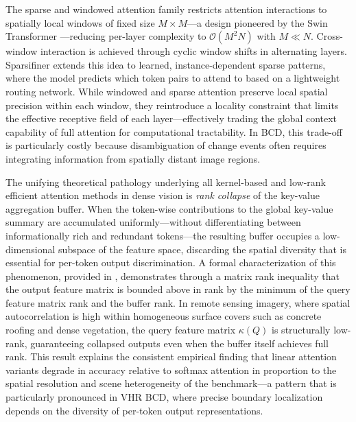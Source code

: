 The sparse and windowed attention family restricts attention interactions to
spatially local windows of fixed size $M \times M$---a design pioneered by
the Swin Transformer \cite{Liu2021Swin}---reducing per-layer complexity
to $\mathcal{O}(M^2 N)$ with $M \ll N$. Cross-window
interaction is achieved through cyclic window shifts in alternating layers.
Sparsifiner \cite{Wei2023Sparsifiner} extends this idea to learned,
instance-dependent sparse patterns, where the model predicts which token
pairs to attend to based on a lightweight routing network. While windowed and
sparse attention preserve local spatial precision within each window, they
reintroduce a locality constraint that limits the effective receptive field
of each layer---effectively trading the global context capability of full
attention for computational tractability. In BCD, this trade-off is
particularly costly because disambiguation of change events often requires
integrating information from spatially distant image regions.

The unifying theoretical pathology underlying all kernel-based and low-rank
efficient attention methods in dense vision is \emph{rank collapse} of the
key-value aggregation buffer. When the token-wise contributions to the global
key-value summary are accumulated uniformly---without differentiating between
informationally rich and redundant tokens---the resulting buffer occupies a
low-dimensional subspace of the feature space, discarding the spatial diversity
that is essential for per-token output discrimination. A formal characterization
of this phenomenon, provided in \cite{Fan2025RALA}, demonstrates through a
matrix rank inequality that the output feature matrix is bounded above in rank
by the minimum of the query feature matrix rank and the buffer rank. In remote
sensing imagery, where spatial autocorrelation is high within homogeneous
surface covers such as concrete roofing and dense vegetation, the query feature
matrix $\kappa(Q)$ is structurally low-rank, guaranteeing collapsed outputs
even when the buffer itself achieves full rank. This result explains the
consistent empirical finding that linear attention variants degrade in accuracy
relative to softmax attention in proportion to the spatial resolution and scene
heterogeneity of the benchmark---a pattern that is particularly pronounced in
VHR BCD, where precise boundary localization depends on the diversity of
per-token output representations.

